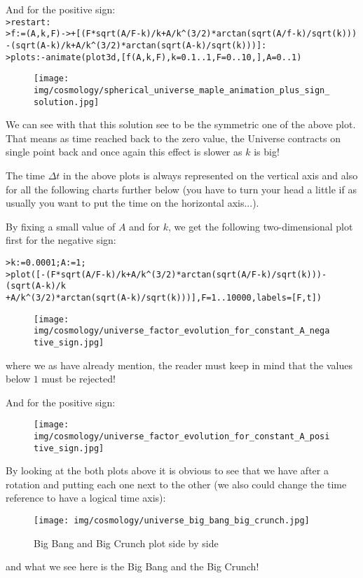 	And for the positive sign:\\
	
	\texttt{>restart:\\
	>f:=(A,k,F)->+[(F*sqrt(A/F-k)/k+A/k\string^(3/2)*arctan(sqrt(A/f-k)/sqrt(k)))\\
	-(sqrt(A-k)/k+A/k\string^(3/2)*arctan(sqrt(A-k)/sqrt(k)))]:\\
	>plots:-animate(plot3d,[f(A,k,F),k=0.1..1,F=0..10,],A=0..1)
	}
	\begin{figure}[H]
		\centering
		\texttt{[image: img/cosmology/spherical\_universe\_maple\_animation\_plus\_sign\_solution.jpg]}
	\end{figure}
	We can see with that this solution see to be the symmetric one of the above plot. That means as time reached back to the zero value, the Universe contracts on single point back and once again this effect is slower as $k$ is big! 
	
	\begin{tcolorbox}[title=Remark,colframe=black,arc=10pt]
	The time $\Delta t$ in the above plots is always represented on the vertical axis and also for all the following charts further below (you have to turn your head a little if as usually you want to put the time on the horizontal axis...).
	\end{tcolorbox}
	By fixing a small value of $A$ and for $k$, we get the following two-dimensional plot first for the negative sign:
	
	\texttt{>k:=0.0001;A:=1;\\
	 >plot([-(F*sqrt(A/F-k)/k+A/k\string^(3/2)*arctan(sqrt(A/F-k)/sqrt(k)))-(sqrt(A-k)/k\\
	+A/k\string^(3/2)*arctan(sqrt(A-k)/sqrt(k)))],F=1..10000,labels=[F,t])}
	\begin{figure}[H]
		\centering
		\texttt{[image: img/cosmology/universe\_factor\_evolution\_for\_constant\_A\_negative\_sign.jpg]}
	\end{figure}
	where we as have already mention, the reader must keep in mind that the values below $1$ must be rejected!
	
	And for the positive sign:
	\begin{figure}[H]
		\centering
		\texttt{[image: img/cosmology/universe\_factor\_evolution\_for\_constant\_A\_positive\_sign.jpg]}
	\end{figure}
	By looking at the both plots above it is obvious to see that we have after a rotation and putting each one next to the other (we also could change the time reference to have a logical time axis):
	\begin{figure}[H]
		\centering
		\texttt{[image: img/cosmology/universe\_big\_bang\_big\_crunch.jpg]}
		\caption{Big Bang and Big Crunch plot side by side}
	\end{figure}
	and what we see here is the Big Bang and the Big Crunch!
	
